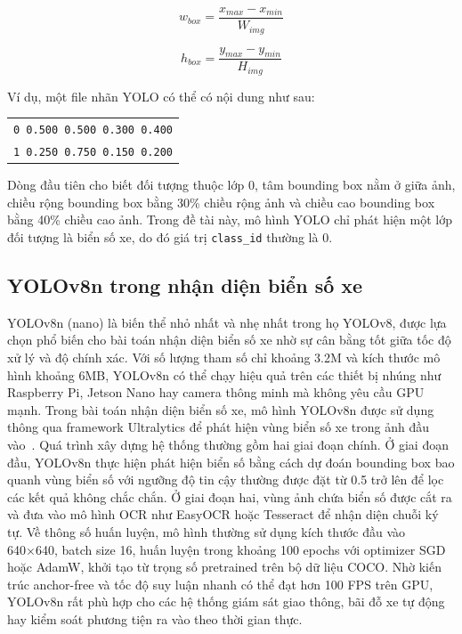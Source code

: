 \documentclass[13pt,a4paper]{report}
\begin{document}
\begin{equation}
	w_{box} = \frac{x_{max} - x_{min}}{W_{img}}
\end{equation}

\begin{equation}
	h_{box} = \frac{y_{max} - y_{min}}{H_{img}}
\end{equation}

Ví dụ, một file nhãn YOLO có thể có nội dung như sau:

\begin{center}
	\begin{tabular}{l}
		\texttt{0 0.500 0.500 0.300 0.400} \\
		\texttt{1 0.250 0.750 0.150 0.200}
	\end{tabular}
\end{center}

Dòng đầu tiên cho biết đối tượng thuộc lớp 0, tâm bounding box nằm ở giữa ảnh, chiều rộng bounding box bằng 30\% chiều rộng ảnh và chiều cao bounding box bằng 40\% chiều cao ảnh. Trong đề tài này, mô hình YOLO chỉ phát hiện một lớp đối tượng là biển số xe, do đó giá trị \texttt{class\_id} thường là 0.

\subsection{YOLOv8n trong nhận diện biển số xe}
YOLOv8n (nano) là biến thể nhỏ nhất và nhẹ nhất trong họ YOLOv8, được lựa chọn phổ biến cho bài toán nhận diện biển số xe nhờ sự cân bằng tốt giữa tốc độ xử lý và độ chính xác. Với số lượng tham số chỉ khoảng 3.2M và kích thước mô hình khoảng 6MB, YOLOv8n có thể chạy hiệu quả trên các thiết bị nhúng như Raspberry Pi, Jetson Nano hay camera thông minh mà không yêu cầu GPU mạnh.
Trong bài toán nhận diện biển số xe, mô hình YOLOv8n được sử dụng thông qua framework Ultralytics để phát hiện vùng biển số xe trong ảnh đầu vào~\cite{ultralytics_yolov8}. Quá trình xây dựng hệ thống thường gồm hai giai đoạn chính. Ở giai đoạn đầu, YOLOv8n thực hiện phát hiện biển số bằng cách dự đoán bounding box bao quanh vùng biển số với ngưỡng độ tin cậy thường được đặt từ 0.5 trở lên để lọc các kết quả không chắc chắn. Ở giai đoạn hai, vùng ảnh chứa biển số được cắt ra và đưa vào mô hình OCR như EasyOCR hoặc Tesseract để nhận diện chuỗi ký tự.
Về thông số huấn luyện, mô hình thường sử dụng kích thước đầu vào 640×640, batch size 16, huấn luyện trong khoảng 100 epochs với optimizer SGD hoặc AdamW, khởi tạo từ trọng số pretrained trên bộ dữ liệu COCO. Nhờ kiến trúc anchor-free và tốc độ suy luận nhanh có thể đạt hơn 100 FPS trên GPU, YOLOv8n rất phù hợp cho các hệ thống giám sát giao thông, bãi đỗ xe tự động hay kiểm soát phương tiện ra vào theo thời gian thực.
\end{document}
